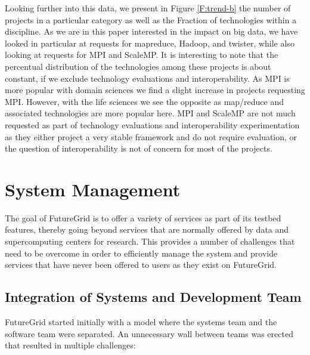 \documentclass[graybox]{svmult}
\begin{document}
Looking further into this data, we present in Figure \ref{F:trend-b} the number of projects in a particular category as well as the Fraction of technologies within a discipline. As we are in this paper interested in the impact on big data, we have looked in particular at requests for mapreduce, Hadoop, and twister, while also looking at requests for MPI and ScaleMP. It is interesting to note that the percentual distribution of the technologies among these projects is about constant, if we exclude technology evaluations and interoperability. As MPI is more popular with domain sciences we find a slight increase in projects requesting MPI. However, with the life sciences we see the opposite as map/reduce and associated technologies are more popular here. MPI and ScaleMP are not much requested as part of technology evaluations and interoperability experimentation as they either project a very stable framework and do not require evaluation, or the question of interoperability is not of concern for most of the projects.  













\section{System Management}\label{S:devops}


The goal of FutureGrid is to offer a variety of services as part of its testbed features, thereby going beyond services that are normally offered by data and supercomputing centers for research. This provides a number of challenges that need to be overcome in order to efficiently manage the system and provide services that have never been offered to users as they exist on FutureGrid.


\subsection{Integration of Systems and Development Team}


FutureGrid started initially with a model where the systems team and the software team were separated. An unnecessary wall between teams was erected that resulted in multiple challenges:
\end{document}
